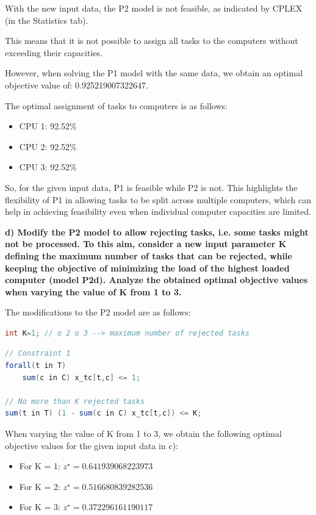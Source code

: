 \documentclass{article}
\begin{document}
With the new input data, the P2 model is not feasible, as indicated by CPLEX (in the Statistics tab).

This means that it is not possible to assign all tasks to the computers without exceeding their capacities.

However, when solving the P1 model with the same data, we obtain an optimal objective value of: 0.925219007322647.

The optimal assignment of tasks to computers is as follows:
\begin{itemize}
    \item CPU 1: 92.52\%
    \item CPU 2: 92.52\%
    \item CPU 3: 92.52\%
\end{itemize}

So, for the given input data, P1 is feasible while P2 is not. This highlights the flexibility of P1 in allowing tasks to be split across multiple computers, which can help in achieving feasibility even when individual computer capacities are limited.
\bigskip

\textbf{d) Modify the P2 model to allow rejecting tasks, i.e. some tasks might not be processed. To this aim, consider a new input parameter K defining the maximum number of tasks that can be rejected, while keeping the objective of minimizing the load of the highest loaded computer (model P2d). Analyze the obtained optimal objective values when varying the value of K from 1 to 3.} 
\medskip

The modifications to the P2 model are as follows:

\begin{lstlisting}[language=Java, frame=single, xleftmargin=0pt]
int K=1; // o 2 o 3 --> maximum number of rejected tasks
\end{lstlisting}
\begin{lstlisting}[language=Java, frame=single, xleftmargin=0pt]
// Constraint 1
forall(t in T)
    sum(c in C) x_tc[t,c] <= 1;
    
// No more than K rejected tasks
sum(t in T) (1 - sum(c in C) x_tc[t,c]) <= K;
\end{lstlisting}

When varying the value of K from 1 to 3, we obtain the following optimal objective values for the given input data in c):
\begin{itemize}
    \item For K = 1: \(z^\star = 0.641939068223973\)
    \item For K = 2: \(z^\star = 0.516680839282536\)
    \item For K = 3: \(z^\star = 0.372296161190117\)
\end{itemize}
\end{document}
